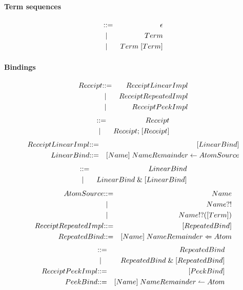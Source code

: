 \paragraph{Term sequences}
\begin{eqnarray*}
  [Term] & \bc & \epsilon \\
  & \;\bm \; & Term \\
  & \;\bm \; & Term \; [Term]
\end{eqnarray*}

\paragraph{Bindings}
\begin{eqnarray*}
  Receipt & \mathbin{\mathbf{::=}} & ReceiptLinearImpl \\
  & \;\mathbin{\mathbf\mid} \; & ReceiptRepeatedImpl \\
  & \;\mathbin{\mathbf\mid} \; & ReceiptPeekImpl
\end{eqnarray*}
\begin{eqnarray*}
  [Receipt] & \bc & Receipt \\
  & \;\bm \; & Receipt \mathsf{;}\; [Receipt]
\end{eqnarray*}
\begin{eqnarray*}
  ReceiptLinearImpl & \mathbin{\mathbf{::=}} & [LinearBind] \\
  LinearBind & \mathbin{\mathbf{::=}} & [Name] \; NameRemainder \; \mathsf{\leftarrow} \; AtomSource
\end{eqnarray*}
\begin{eqnarray*}
  [LinearBind] & \bc & LinearBind \\
  & \;\bm \; & LinearBind \;\mathsf{\&}\; [LinearBind]
\end{eqnarray*}
\begin{eqnarray*}
  AtomSource & \mathbin{\mathbf{::=}} & Name \\
  & \;\mathbin{\mathbf\mid} \; & Name \mathsf{?!} \\
  & \;\mathbin{\mathbf\mid} \; & Name \mathsf{!?} \mathsf{(} [Term] \mathsf{)} \\
  ReceiptRepeatedImpl & \mathbin{\mathbf{::=}} & [RepeatedBind] \\
  RepeatedBind & \mathbin{\mathbf{::=}} & [Name] \; NameRemainder \; \mathsf{\Leftarrow} \; Atom
\end{eqnarray*}
\begin{eqnarray*}
  [RepeatedBind] & \bc & RepeatedBind \\
  & \;\bm \; & RepeatedBind \; \mathsf{\&}\; [RepeatedBind] \\
  ReceiptPeekImpl & \bc & [PeekBind] \\
  PeekBind & \bc & [Name] \; NameRemainder \; \mathsf{\leftharpoonup}\; Atom
\end{eqnarray*}
